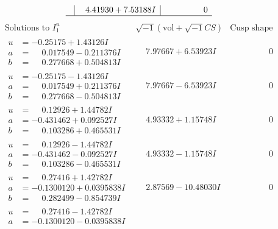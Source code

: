 \documentclass[1p]{elsarticle_modified}
\theoremstyle{definition}
\newcommand{\I}{\sqrt{-1}}
\begin{document}
$$\begin{array}{c|c|c}
 & \phantom{-}4.41930 + 7.53188 I & \phantom{-0.000000 } 0\\
 \hline 
 \end{array}$$\newpage$$\begin{array}{c|c|c}  
\text{Solutions to }I^u_{1}& \I (\text{vol} + \sqrt{-1}CS) & \text{Cusp shape}\\
 \hline 
\begin{aligned}
u &= -0.25175 + 1.43126 I \\
a &= \phantom{-}0.017549 - 0.211376 I \\
b &= \phantom{-}0.277668 + 0.504813 I\end{aligned}
 & \phantom{-}7.97667 + 6.53923 I & \phantom{-0.000000 } 0 \\ \hline\begin{aligned}
u &= -0.25175 - 1.43126 I \\
a &= \phantom{-}0.017549 + 0.211376 I \\
b &= \phantom{-}0.277668 - 0.504813 I\end{aligned}
 & \phantom{-}7.97667 - 6.53923 I & \phantom{-0.000000 } 0 \\ \hline\begin{aligned}
u &= \phantom{-}0.12926 + 1.44782 I \\
a &= -0.431462 + 0.092527 I \\
b &= \phantom{-}0.103286 + 0.465531 I\end{aligned}
 & \phantom{-}4.93332 + 1.15748 I & \phantom{-0.000000 } 0 \\ \hline\begin{aligned}
u &= \phantom{-}0.12926 - 1.44782 I \\
a &= -0.431462 - 0.092527 I \\
b &= \phantom{-}0.103286 - 0.465531 I\end{aligned}
 & \phantom{-}4.93332 - 1.15748 I & \phantom{-0.000000 } 0 \\ \hline\begin{aligned}
u &= \phantom{-}0.27416 + 1.42782 I \\
a &= -0.1300120 + 0.0395838 I \\
b &= \phantom{-}0.282499 - 0.854739 I\end{aligned}
 & \phantom{-}2.87569 - 10.48030 I & \phantom{-0.000000 } 0 \\ \hline\begin{aligned}
u &= \phantom{-}0.27416 - 1.42782 I \\
a &= -0.1300120 - 0.0395838 I \\

\end{aligned}
\end{array}$$
\end{document}
